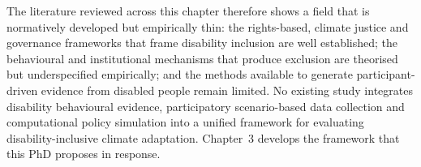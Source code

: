 \documentclass[12pt,a4paper]{report}
\begin{document}
The literature reviewed across this chapter therefore shows a field that is normatively developed but empirically thin: the rights-based, climate justice and governance frameworks that frame disability inclusion are well established; the behavioural and institutional mechanisms that produce exclusion are theorised but underspecified empirically; and the methods available to generate participant-driven evidence from disabled people remain limited. No existing study integrates disability behavioural evidence, participatory scenario-based data collection and computational policy simulation into a unified framework for evaluating disability-inclusive climate adaptation. Chapter~3 develops the framework that this PhD proposes in response.




\end{document}
